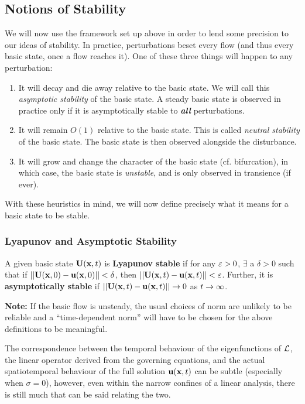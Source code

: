 \subsection{Notions of Stability}

We will now use the framework set up above in order to lend some precision to our ideas of stability. In practice, perturbations beset every flow (and thus every basic state, once a flow reaches it). One of these three things will happen to any perturbation: 
\begin{enumerate}
    \item It will decay and die away relative to the basic state. We will call this \emph{asymptotic stability} of the basic state. A steady basic state is observed in practice only if it is asymptotically stable to \textbf{\emph{all}} perturbations. 
    \item It will remain $O(1)$ relative to the basic state. This is called \emph{neutral stability} of the basic state. The basic state is then observed alongside the disturbance. 
    \item It will grow and change the character of the basic state (cf. bifurcation), in which case, the basic state is \emph{unstable}, and is only observed in transience (if ever).
\end{enumerate}
With these heuristics in mind, we will now define precisely what it means for a basic state to be stable. 
\subsubsection{Lyapunov and Asymptotic Stability}
A given basic state ${\textbf{U}}({\textbf{x}}, t)$ is \textbf{Lyapunov stable} if for any $\varepsilon > 0$, $\exists$ a $\delta > 0$ such that if $||{\textbf{U}}({\textbf{x}}, 0) - {\textbf{u}}({\textbf{x}}, 0)|| < \delta$, then $||{\textbf{U}}({\textbf{x}}, t) - {\textbf{u}}({\textbf{x}}, t)|| < \varepsilon$. Further, it is \textbf{asymptotically stable} if $||{\textbf{U}}({\textbf{x}}, t) - {\textbf{u}}({\textbf{x}}, t)|| \rightarrow 0$ as $t \rightarrow \infty$. 

\textbf{Note:} If the basic flow is unsteady, the usual choices of norm are unlikely to be reliable and a ``time-dependent norm'' will have to be chosen for the above definitions to be meaningful. 

The correspondence between the temporal behaviour of the eigenfunctions of $\mathcal{L}$, the linear operator derived from the governing equations, and the actual spatiotemporal behaviour of the full solution ${\textbf{u}}({\textbf{x}}, t)$ can be subtle (especially when $\sigma = 0$), however, even within the narrow confines of a linear analysis, there is still much that can be said relating the two. 

